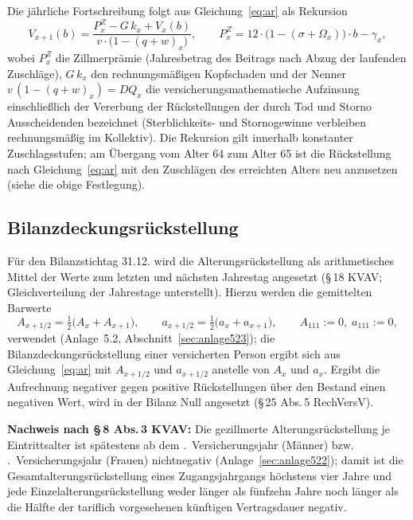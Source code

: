 Die jährliche Fortschreibung folgt aus Gleichung~\eqref{eq:ar} als
Rekursion
\begin{equation}
V_{x+1}(b) = \frac{P^{Z}_x - G\,k_x + V_x(b)}{v\cdot\bigl(1-(q+w)_x\bigr)},
\qquad P^{Z}_x = 12\cdot\bigl(1-(\sigma+\Omega_x)\bigr)\cdot b - \gamma_x,
\label{eq:arrek}
\end{equation}
wobei $P^{Z}_x$ die Zillmerprämie (Jahresbetrag des Beitrags nach Abzug
der laufenden Zuschläge), $G\,k_x$ den rechnungsmäßigen Kopfschaden und
der Nenner $v\,(1-(q+w)_x) = DQ_x$ die versicherungsmathematische
Aufzinsung einschließlich der Vererbung der Rückstellungen der durch
Tod und Storno Ausscheidenden bezeichnet (Sterblichkeits- und
Stornogewinne verbleiben rechnungsmäßig im Kollektiv). Die Rekursion
gilt innerhalb konstanter Zuschlagsstufen; am Übergang vom Alter 64
zum Alter 65 ist die Rückstellung nach Gleichung~\eqref{eq:ar} mit den
Zuschlägen des erreichten Alters neu anzusetzen (siehe die obige
Festlegung).

\subsection{Bilanzdeckungsrückstellung}\label{sec:bilanzar}

Für den Bilanzstichtag 31.12. wird die Alterungsrückstellung als
arithmetisches Mittel der Werte zum letzten und nächsten Jahrestag
angesetzt (\S\,18 KVAV; Gleichverteilung der Jahrestage unterstellt).
Hierzu werden die gemittelten Barwerte
\begin{equation}
A_{x+1/2} = \tfrac{1}{2}\bigl(A_x + A_{x+1}\bigr),
\qquad
a_{x+1/2} = \tfrac{1}{2}\bigl(a_x + a_{x+1}\bigr),
\qquad A_{111} := 0,\; a_{111} := 0,
\label{eq:halbbarwerte}
\end{equation}
verwendet (Anlage~5.2, Abschnitt~\ref{sec:anlage523}); die
Bilanzdeckungsrückstellung einer versicherten Person ergibt sich aus
Gleichung~\eqref{eq:ar} mit $A_{x+1/2}$ und $a_{x+1/2}$ anstelle von
$A_x$ und $a_x$. Ergibt die Aufrechnung negativer gegen positive
Rückstellungen über den Bestand einen negativen Wert, wird in der
Bilanz Null angesetzt (\S\,25 Abs.\,5 RechVersV).

\textbf{Nachweis nach \S\,8 Abs.\,3 KVAV:} Die gezillmerte
Alterungsrückstellung je Eintrittsalter ist spätestens ab dem
\MaxNegM.~Versicherungsjahr (Männer) bzw. \MaxNegF.~Versicherungsjahr
(Frauen) nichtnegativ (Anlage~\ref{sec:anlage522});
damit ist die Gesamtalterungsrückstellung eines Zugangsjahrgangs
höchstens vier Jahre und jede Einzelalterungsrückstellung weder länger
als fünfzehn Jahre noch länger als die Hälfte der tariflich
vorgesehenen künftigen Vertragsdauer negativ.


